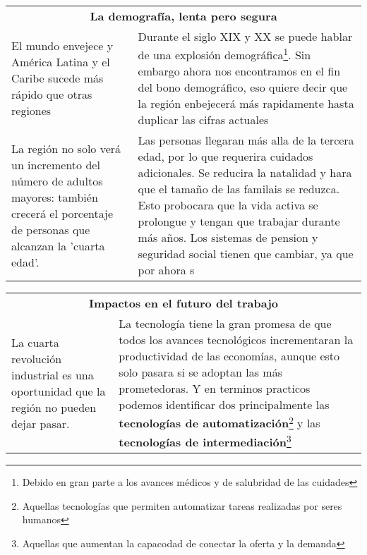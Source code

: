\begingroup
\setlength{\tabcolsep}{12pt} %
\renewcommand{\arraystretch}{1.5} %
\begin{tabular}{p{4cm}|p{11cm}}
\multicolumn{2}{c}{\large \bf  La demografía, lenta pero segura} \\
El mundo envejece y América Latina y el Caribe sucede más rápido que otras regiones&Durante el siglo XIX y XX se puede hablar de una explosión demográfica\footnote{Debido en gran parte a los avances médicos y de salubridad de las cuidades}. Sin embargo ahora nos encontramos en el fin del bono demográfico, eso quiere decir que la región enbejecerá más rapidamente hasta duplicar las cifras actuales\\
La región no solo verá un incremento del número de adultos mayores: también crecerá el porcentaje de personas que alcanzan la 'cuarta edad'.&Las personas llegaran más alla de la tercera edad, por lo que requerira cuidados adicionales. Se reducira la natalidad y hara que el tamaño de las familais se reduzca. Esto probocara que la vida activa se prolongue y tengan que trabajar durante más años. Los sistemas de pension y seguridad social tienen que cambiar, ya que por ahora s\\
\end{tabular}
\endgroup

\begingroup
\setlength{\tabcolsep}{12pt} %
\renewcommand{\arraystretch}{1.5} %
\begin{tabular}{p{4cm}|p{11cm}}
\multicolumn{2}{c}{\large \bf  Impactos en el futuro del trabajo}\\
La cuarta revolución industrial es una oportunidad que la región no pueden dejar pasar. &
La tecnología tiene la gran promesa de que todos los avances tecnológicos incrementaran la productividad de las economías, aunque esto solo pasara si se adoptan las más prometedoras. Y en terminos practicos podemos identificar dos principalmente las {\bf tecnologías de automatización}\footnote{Aquellas tecnologías que permiten automatizar tareas realizadas por seres humanos} y las {\bf tecnologías de intermediación}\footnote{Aquellas que aumentan la capacodad de conectar la oferta y la demanda}
\end{tabular}
\endgroup

